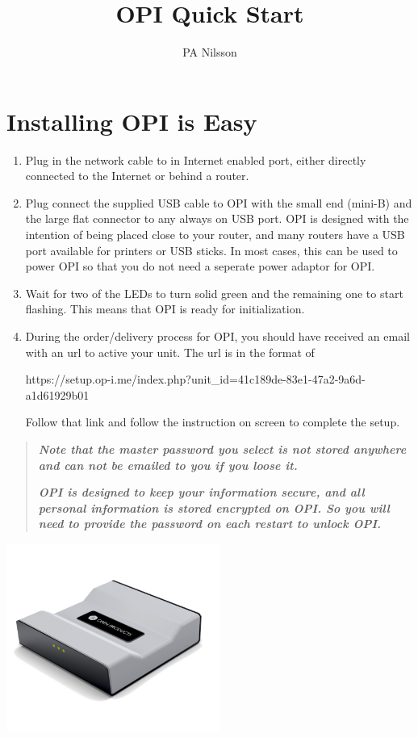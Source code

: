\documentclass[12pt,a4paper,titlepage]{article}
\author{PA Nilsson}
\title{OPI Quick Start}
\begin{document}
\FloatBarrier
\section{Installing OPI is Easy}
	\begin{enumerate}

		\item Plug in the network cable to in Internet enabled port, either directly connected to the Internet or behind a router.

		\item Plug connect the supplied USB cable to OPI with the small end (mini-B) and the large flat connector to any always on USB port. OPI is designed with the intention of being placed close to your router, and many routers have a USB port available for printers or USB sticks. In most cases, this can be used to power OPI so that you do not need a seperate power adaptor for OPI.

		\item Wait for two of the LEDs to turn solid green and the remaining one to start flashing. This means that OPI is ready for initialization.

		\item During the order/delivery process for OPI, you should have received an email with an url to active your unit. The url is in the format of

\begin{small}
https://setup.op-i.me/index.php?unit\_id=41c189de-83e1-47a2-9a6d-a1d61929b01
\end{small}

Follow that link and follow the instruction on screen to complete the setup.

\end{enumerate}
\begin{quote}
\emph{\textbf{
Note that the master password you select is not stored anywhere and can not be emailed to you if you loose it.
}}

\emph{\textbf{
OPI is designed to keep your information secure, and all personal information is stored encrypted on OPI. So you will need to provide the password on each restart to unlock OPI.
}}
\end{quote}

\begin{center}
	\includegraphics[width=7cm]{./img/OPI_iso}
\end{center}
\end{document}
